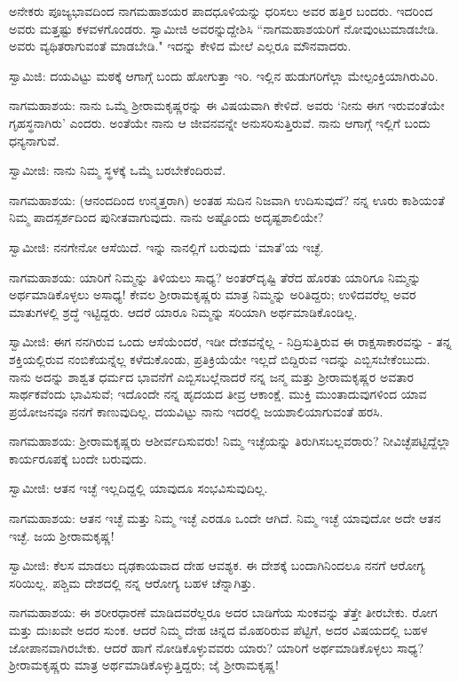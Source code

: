 ಅನೇಕರು ಪೂಜ್ಯಭಾವದಿಂದ ನಾಗಮಹಾಶಯರ ಪಾದಧೂಳಿಯನ್ನು ಧರಿಸಲು ಅವರ ಹತ್ತಿರ ಬಂದರು. ಇದರಿಂದ ಅವರು ಮತ್ತಷ್ಟು ಕಳವಳಗೊಂಡರು. ಸ್ವಾಮೀಜಿ ಅವರನ್ನುದ್ದೇಶಿಸಿ “ನಾಗಮಹಾಶಯರಿಗೆ ನೋವುಂಟುಮಾಡಬೇಡಿ. ಅವರು ವ್ಯಥಿತರಾಗುವಂತೆ ಮಾಡಬೇಡಿ." ಇದನ್ನು ಕೇಳಿದ ಮೇಲೆ ಎಲ್ಲರೂ ಮೌನವಾದರು.

ಸ್ವಾಮಿಜಿ: ದಯವಿಟ್ಟು ಮಠಕ್ಕೆ ಆಗಾಗ್ಗೆ ಬಂದು ಹೋಗುತ್ತಾ ಇರಿ. ಇಲ್ಲಿನ ಹುಡುಗರಿಗೆಲ್ಲಾ ಮೇಲ್ಪಂಕ್ತಿಯಾಗಿರುವಿರಿ.

ನಾಗಮಹಾಶಯ: ನಾನು ಒಮ್ಮೆ ಶ‍್ರೀರಾಮಕೃಷ್ಣರನ್ನು ಈ ವಿಷಯವಾಗಿ ಕೇಳಿದೆ. ಅವರು ‘ನೀನು ಈಗ ಇರುವಂತೆಯೇ ಗೃಹಸ್ಥನಾಗಿರು’ ಎಂದರು. ಅಂತೆಯೇ ನಾನು ಆ ಜೀವನವನ್ನೇ ಅನುಸರಿಸುತ್ತಿರುವೆ. ನಾನು ಆಗಾಗ್ಗೆ ಇಲ್ಲಿಗೆ ಬಂದು ಧನ್ಯನಾಗುವೆ.

ಸ್ವಾಮೀಜಿ: ನಾನು ನಿಮ್ಮ ಸ್ಥಳಕ್ಕೆ ಒಮ್ಮೆ ಬರಬೇಕೆಂದಿರುವೆ.

ನಾಗಮಹಾಶಯ: (ಆನಂದದಿಂದ ಉನ್ಮತ್ತರಾಗಿ) ಅಂತಹ ಸುದಿನ ನಿಜವಾಗಿ ಉದಿಸುವುದೆ? ನನ್ನ ಊರು ಕಾಶಿಯಂತೆ ನಿಮ್ಮ ಪಾದಸ್ಪರ್ಶದಿಂದ ಪುನೀತವಾಗುವುದು. ನಾನು ಅಷ್ಟೊಂದು ಅದೃಷ್ಟಶಾಲಿಯೇ?

ಸ್ವಾಮೀಜಿ: ನನಗೇನೋ ಆಸೆಯಿದೆ. ಇನ್ನು ನಾನಲ್ಲಿಗೆ ಬರುವುದು ‘ಮಾತೆ’ಯ ಇಚ್ಛೆ.

ನಾಗಮಹಾಶಯ: ಯಾರಿಗೆ ನಿಮ್ಮನ್ನು ತಿಳಿಯಲು ಸಾಧ್ಯ? ಅಂತರ್‌ದೃಷ್ಟಿ ತೆರೆದ ಹೊರತು ಯಾರಿಗೂ ನಿಮ್ಮನ್ನು ಅರ್ಥಮಾಡಿಕೊಳ್ಳಲು ಅಸಾಧ್ಯ! ಕೇವಲ ಶ‍್ರೀರಾಮಕೃಷ್ಣರು ಮಾತ್ರ ನಿಮ್ಮನ್ನು ಅರಿತಿದ್ದರು; ಉಳಿದವರೆಲ್ಲ ಅವರ ಮಾತುಗಳಲ್ಲಿ ಶ್ರದ್ಧೆ ಇಟ್ಟಿದ್ದರು. ಆದರೆ ಯಾರೂ ನಿಮ್ಮನ್ನು ಸರಿಯಾಗಿ ಅರ್ಥಮಾಡಿಕೊಂಡಿಲ್ಲ.

ಸ್ವಾಮೀಜಿ: ಈಗ ನನಗಿರುವ ಒಂದು ಆಸೆಯೆಂದರೆ, ಇಡೀ ದೇಶವನ್ನೆಲ್ಲ - ನಿದ್ರಿಸುತ್ತಿರುವ ಈ ರಾಕ್ಷಸಾಕಾರವನ್ನು - ತನ್ನ ಶಕ್ತಿಯಲ್ಲಿರುವ ನಂಬಿಕೆಯನ್ನೆಲ್ಲ ಕಳೆದುಕೊಂಡು, ಪ್ರತಿಕ್ರಿಯೆಯೇ ಇಲ್ಲದೆ ಬಿದ್ದಿರುವ ಇದನ್ನು ಎಬ್ಬಿಸಬೇಕೆಂಬುದು. ನಾನು ಅದನ್ನು ಶಾಶ್ವತ ಧರ್ಮದ ಭಾವನೆಗೆ ಎಬ್ಬಿಸಬಲ್ಲೆನಾದರೆ ನನ್ನ ಜನ್ಮ ಮತ್ತು ಶ‍್ರೀರಾಮಕೃಷ್ಣರ ಅವತಾರ ಸಾರ್ಥಕವೆಂದು ಭಾವಿಸುವೆ; ಇದೊಂದೇ ನನ್ನ ಹೃದಯದ ತೀವ್ರ ಆಕಾಂಕ್ಷೆ. ಮುಕ್ತಿ ಮುಂತಾದುವುಗಳಿಂದ ಯಾವ ಪ್ರಯೋಜನವೂ ನನಗೆ ಕಾಣುವುದಿಲ್ಲ. ದಯವಿಟ್ಟು ನಾನು ಇದರಲ್ಲಿ ಜಯಶಾಲಿಯಾಗುವಂತೆ ಹರಸಿ.

ನಾಗಮಹಾಶಯ: ಶ‍್ರೀರಾಮಕೃಷ್ಣರು ಆಶೀರ್ವದಿಸುವರು! ನಿಮ್ಮ ಇಚ್ಛೆಯನ್ನು ತಿರುಗಿಸಬಲ್ಲವರಾರು? ನೀವಿಚ್ಛೆಪಟ್ಟಿದ್ದೆಲ್ಲಾ ಕಾರ್ಯರೂಪಕ್ಕೆ ಬಂದೇ ಬರುವುದು.

ಸ್ವಾಮೀಜಿ: ಆತನ ಇಚ್ಛೆ ಇಲ್ಲದಿದ್ದಲ್ಲಿ ಯಾವುದೂ ಸಂಭವಿಸುವುದಿಲ್ಲ.

ನಾಗಮಹಾಶಯ: ಆತನ ಇಚ್ಛೆ ಮತ್ತು ನಿಮ್ಮ ಇಚ್ಛೆ ಎರಡೂ ಒಂದೇ ಆಗಿದೆ. ನಿಮ್ಮ ಇಚ್ಛೆ ಯಾವುದೋ ಅದೇ ಆತನ ಇಚ್ಛೆ. ಜಯ ಶ‍್ರೀರಾಮಕೃಷ್ಣ!

ಸ್ವಾಮೀಜಿ: ಕೆಲಸ ಮಾಡಲು ದೃಢಕಾಯವಾದ ದೇಹ ಆವಶ್ಯಕ. ಈ ದೇಶಕ್ಕೆ ಬಂದಾಗಿನಿಂದಲೂ ನನಗೆ ಆರೋಗ್ಯ ಸರಿಯಿಲ್ಲ. ಪಶ್ಚಿಮ ದೇಶದಲ್ಲಿ ನನ್ನ ಆರೋಗ್ಯ ಬಹಳ ಚೆನ್ನಾಗಿತ್ತು.

ನಾಗಮಹಾಶಯ: ಈ ಶರೀರಧಾರಣೆ ಮಾಡಿದವರೆಲ್ಲರೂ ಅದರ ಬಾಡಿಗೆಯ ಸುಂಕವನ್ನು ತೆತ್ತೇ ತೀರಬೇಕು. ರೋಗ ಮತ್ತು ದುಃಖವೇ ಅದರ ಸುಂಕ. ಆದರೆ ನಿಮ್ಮ ದೇಹ ಚಿನ್ನದ ಮೊಹರಿರುವ ಪೆಟ್ಟಿಗೆ, ಅದರ ವಿಷಯದಲ್ಲಿ ಬಹಳ ಜೋಪಾನವಾಗಿರಬೇಕು. ಆದರೆ ಹಾಗೆ ನೋಡಿಕೊಳ್ಳುವವರು ಯಾರು? ಯಾರಿಗೆ ಅರ್ಥಮಾಡಿಕೊಳ್ಳಲು ಸಾಧ್ಯ? ಶ‍್ರೀರಾಮಕೃಷ್ಣರು ಮಾತ್ರ ಅರ್ಥಮಾಡಿಕೊಳ್ಳುತ್ತಿದ್ದರು; ಜೈ ಶ‍್ರೀರಾಮಕೃಷ್ಣ!

